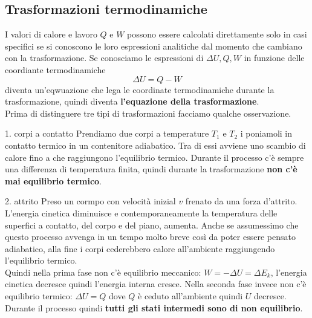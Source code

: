 \documentclass[x11names]{report}
\begin{document}
	\subsection{Trasformazioni termodinamiche}
	I valori di calore e lavoro \(Q\) e \(W\) possono essere calcolati direttamente solo in casi specifici se si conoscono le loro espressioni analitiche dal momento che cambiano con la trasformazione.  Se conosciamo le espressioni di \(\Delta U,Q,W\) in funzione delle coordiante termodinamiche 
	\[ 
	\Delta U = Q -W
	\]
	diventa un'eqwuazione che lega le coordinate termodinamiche durante la trasformazione, quindi diventa \textbf{l'equazione della trasformazione}.\\
	
	\noindent
	Prima di distinguere tre tipi di trasformazioni facciamo qualche osservazione.
	\begin{es}{1. corpi a contatto}
		Prendiamo due corpi a temperature \(T_1\) e \(T_2\) i poniamoli in contatto termico in un contenitore adiabatico. Tra di essi avviene uno scambio di calore fino a che raggiungono l'equilibrio termico. Durante il processo c'è sempre una differenza di temperatura finita, quindi durante la trasformazione \textbf{non c'è mai equilibrio termico}.
	\end{es}
	\begin{es}{2. attrito}
		Preso un cormpo con velocità inizial \(v\) frenato da una forza d'attrito. L'energia cinetica diminuisce e contemporaneamente la temperatura delle superfici a contatto, del corpo e del piano, aumenta. Anche se assumessimo che questo processo avvenga in un tempo molto breve così da poter essere pensato adiabatico, alla fine i corpi cederebbero calore all'ambiente raggiungendo l'equilibrio termico. \\
		
		Quindi nella prima fase non c'è equilibrio meccanico: \(W = -\Delta U = \Delta E_k\), l'energia cinetica decresce quindi l'energia interna cresce. Nella seconda fase invece non c'è equilibrio termico: \(\Delta U = Q\) dove \(Q\) è ceduto all'ambiente quindi \(U\) decresce. Durante il processo quindi \textbf{tutti gli stati intermedi sono di non equilibrio}.
	\end{es}
	
\end{document}
